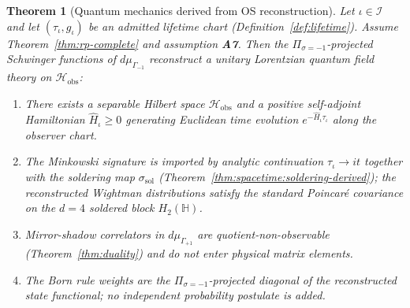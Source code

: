 \documentclass[11pt]{article}
\theoremstyle{plain}
\newtheorem{theorem}{Theorem}[section]
\theoremstyle{definition}
\theoremstyle{remark}
\numberwithin{equation}{section}
\newcommand{\Quat}{\mathbb{H}}
\begin{document}
\begin{theorem}[Quantum mechanics derived from OS reconstruction]
\label{thm:qm-derived}
Let $\iota\in\mathcal{I}$ and let $(\tau_\iota,g_\iota)$ be an admitted lifetime
chart (Definition~\ref{def:lifetime}). Assume Theorem~\ref{thm:rp-complete} and
assumption \textbf{A7}. Then the $\Pi_{\sigma=-1}$-projected Schwinger
functions of $d\mu_{\Gamma_{-1}}$ reconstruct a unitary Lorentzian quantum
field theory on $\mathcal{H}_{\mathrm{obs}}$:
\begin{enumerate}[label=(\roman*),leftmargin=*]
  \item There exists a separable Hilbert space $\mathcal{H}_{\mathrm{obs}}$ and
    a positive self-adjoint Hamiltonian $\hat H_\iota\ge 0$ generating
    Euclidean time evolution $e^{-\hat H_\iota\tau_\iota}$ along the observer
    chart.
  \item The Minkowski signature is imported by analytic continuation
    $\tau_\iota\to i t$ together with the soldering map
    $\sigma_{\mathrm{sol}}$ (Theorem~\ref{thm:spacetime:soldering-derived});
    the reconstructed Wightman distributions satisfy the standard
    Poincar\'e covariance on the $d=4$ soldered block $H_2(\Quat)$.
  \item Mirror-shadow correlators in $d\mu_{\Gamma_{+1}}$ are
    quotient-non-observable (Theorem~\ref{thm:duality}) and do not enter
    physical matrix elements.
  \item The Born rule weights are the $\Pi_{\sigma=-1}$-projected diagonal of
    the reconstructed state functional; no independent probability postulate is
    added.
\end{enumerate}
\end{theorem}
\end{document}
